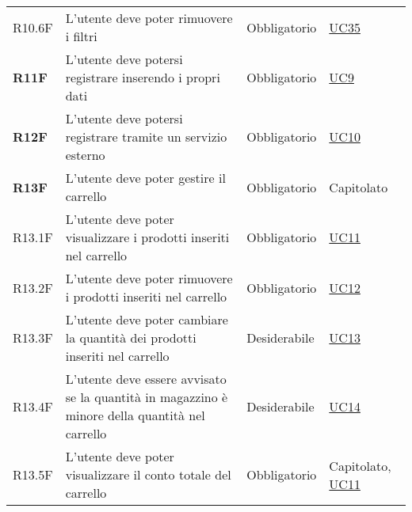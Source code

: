 \begin{center}
\begin{longtable}[!h]{p{50px} p{245px} p{75px} p{50px}}
        R10.6F                                & L'utente deve poter rimuovere i filtri                                                                                                                 & Obbligatorio             & \hyperref[sec:UC35]{UC35}                      \\
        \textbf{R11F}                         & L'utente deve potersi registrare inserendo i propri dati                                                                                               & Obbligatorio             & \hyperref[sec:UC9]{UC9}                        \\
        \textbf{R12F}                         & L'utente deve potersi registrare tramite un servizio esterno                                                                                           & Obbligatorio             & \hyperref[sec:UC10]{UC10}                      \\
        \textbf{R13F}                         & L'utente deve poter gestire il carrello                                                                                                                & Obbligatorio             & Capitolato                                     \\
        R13.1F                                & L'utente deve poter visualizzare i prodotti inseriti nel carrello                                                                                      & Obbligatorio             & \hyperref[sec:UC11]{UC11}                      \\
        R13.2F                                & L'utente deve poter rimuovere i prodotti inseriti nel carrello                                                                                         & Obbligatorio             & \hyperref[sec:UC12]{UC12}                      \\
        R13.3F                                & L'utente deve poter cambiare la quantità dei prodotti inseriti nel carrello                                                                            & Desiderabile             & \hyperref[sec:UC13]{UC13}                      \\
        R13.4F                                & L'utente deve essere avvisato se la quantità in magazzino è minore della quantità nel carrello                                                         & Desiderabile             & \hyperref[sec:UC14]{UC14}                      \\
        R13.5F                                & L'utente deve poter visualizzare il conto totale del carrello                                                                                          & Obbligatorio             & Capitolato, \newline \hyperref[sec:UC11]{UC11} \\

\end{longtable}
\end{center}

